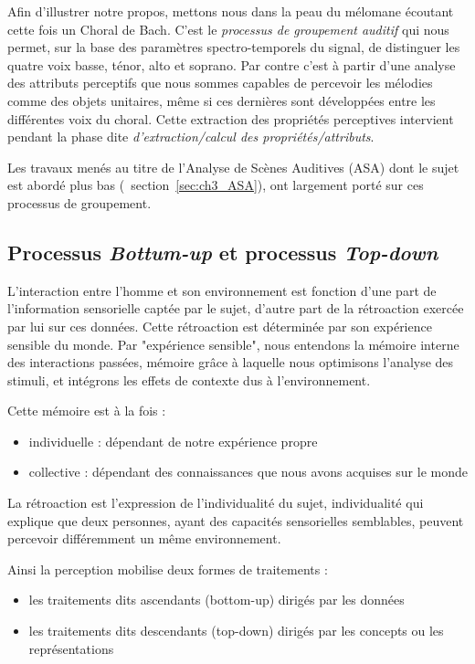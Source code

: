 Afin d'illustrer notre propos, mettons nous dans la peau du mélomane écoutant cette fois un Choral de Bach. C'est le \emph{processus de groupement auditif} qui nous permet, sur la base des paramètres spectro-temporels du signal, de distinguer les quatre voix basse, ténor, alto et soprano. Par contre c'est à partir d'une analyse des attributs perceptifs que nous sommes capables de percevoir les mélodies comme des objets unitaires, même si ces dernières sont développées entre les différentes voix du choral. Cette extraction des propriétés perceptives intervient pendant la phase dite \emph{d'extraction/calcul des propriétés/attributs}.

Les travaux menés au titre de l'Analyse de Scènes Auditives (ASA) dont le sujet est abordé plus bas (\Cf~section~\ref{sec:ch3_ASA}), ont largement porté sur ces processus de groupement.

\subsection{Processus \emph{Bottum-up} et processus \emph{Top-down}}
\label{sec:ch3_butd}

L'interaction entre l'homme et son environnement est fonction d'une part de l'information sensorielle captée par le sujet, d'autre part de la rétroaction exercée par lui sur ces données. Cette rétroaction est déterminée par son expérience sensible du monde. Par "expérience sensible", nous entendons la mémoire interne des interactions passées, mémoire grâce à laquelle nous optimisons l'analyse des stimuli, et intégrons les effets de contexte dus à l'environnement.

Cette mémoire est à la fois :

\begin{itemize}
\item individuelle : dépendant de notre expérience propre
\item collective : dépendant des connaissances que nous avons acquises sur le monde
\end{itemize}

La rétroaction est l'expression de l'individualité du sujet, individualité qui explique que deux personnes, ayant des capacités sensorielles semblables, peuvent percevoir différemment un même environnement.

Ainsi la perception mobilise deux formes de traitements :

\begin{itemize}
\item les traitements dits ascendants (bottom-up) dirigés par les données
\item les traitements dits descendants (top-down) dirigés par les concepts ou les représentations
\end{itemize}

